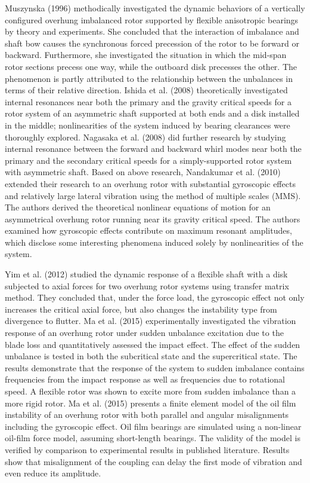 		Muszynska (1996) \cite{Muszynska 96} methodically investigated the dynamic behaviors of a vertically configured overhung imbalanced rotor supported by flexible anisotropic bearings by theory and experiments. She concluded that the interaction of imbalance and shaft bow causes the synchronous forced precession of the rotor to be forward or backward. Furthermore, she investigated the situation in which the mid-span rotor sections precess one way, while the outboard disk precesses the other. The phenomenon is partly attributed to the relationship between the unbalances in terms of their relative direction. Ishida et al. (2008) \cite{Ishida 2008} theoretically investigated internal resonances near both the primary and the gravity critical speeds for a rotor system of an asymmetric shaft supported at both ends and a disk installed in the middle; nonlinearities of the system induced by bearing clearances were thoroughly explored. Nagasaka et al. (2008) \cite{Nagasaka} did further research by studying internal resonance between the forward and backward whirl modes near both the primary and the secondary critical speeds for a simply-supported rotor system with  asymmetric shaft. Based on above research, Nandakumar et al. (2010) \cite{Nandakumar} extended their research to an overhung rotor with substantial gyroscopic effects and relatively large lateral vibration using the method of multiple scales (MMS). The authors derived the theoretical nonlinear equations of motion for an asymmetrical overhung rotor running near its gravity critical speed. The authors examined how gyroscopic effects contribute on maximum resonant amplitudes, which disclose some interesting phenomena induced solely by nonlinearities of the system.
		\par 
		Yim et al. (2012) \cite{Yim} studied the dynamic response of a flexible shaft with a disk subjected to axial forces for two overhung rotor systems using transfer matrix method. They concluded that, under the force load, the gyroscopic effect not only increases the critical axial force, but also changes the instability type from divergence to flutter. Ma et al. (2015) \cite{Ma}experimentally investigated the vibration response of an overhung rotor under sudden unbalance excitation due to the blade loss and quantitatively assessed the impact effect. The effect of the sudden unbalance is tested in both the subcritical state and the supercritical state. The results demonstrate that the response of the system to sudden imbalance contains frequencies from the impact response as well as frequencies due to rotational speed. A flexible rotor was shown to excite more from sudden imbalance than a more rigid rotor. Ma et al. (2015) \cite{Ma, H} presents a finite element model of the oil film instability of an overhung rotor with both parallel and angular misalignments including the gyroscopic effect. Oil film bearings are simulated using a non-linear oil-film force model, assuming short-length bearings. The validity of the model is verified by comparison to experimental results in published literature. Results show that misalignment of the coupling can delay the first mode of vibration and even reduce its amplitude.
